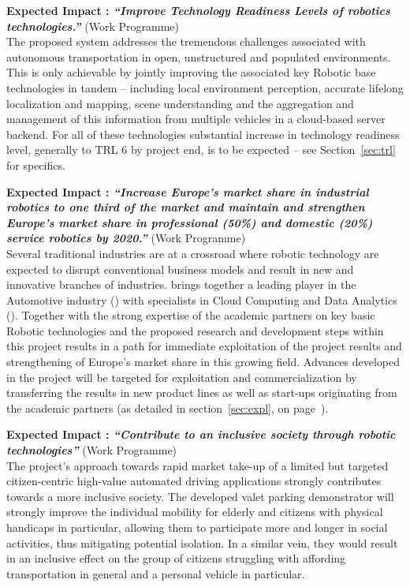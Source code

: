 \textbf{Expected Impact  : \textit{``Improve Technology Readiness Levels of robotics technologies.''}} (Work Programme) \\
The proposed system addresses the tremendous challenges associated with autonomous transportation in open, unstructured and populated environments. This is only achievable by jointly improving the associated key Robotic base technologies in tandem -- including local environment perception, accurate lifelong localization and mapping, scene understanding and the aggregation and management of this information from multiple vehicles in a cloud-based server backend. 
For all of these technologies substantial increase in technology readiness level, generally to TRL 6 by project end, is to be expected -- see Section~\ref{sec:trl} for specifics. 


\textbf{Expected Impact  : \textit{``Increase Europe's market share in industrial robotics to one third of the market and maintain and strengthen Europe's market share in professional (50\%) and domestic (20\%) service robotics by 2020.''}} (Work Programme) \\
Several traditional industries are at a crossroad where robotic technology are expected to disrupt conventional business models and result in new and innovative branches of industries. \Project{} brings together a leading player in the Automotive industry (\VW) with specialists in Cloud Computing and Data Analytics (\IBM). Together with the strong expertise of the academic partners on key basic Robotic technologies and the proposed research and development steps within this project results in a path for immediate exploitation of the project results and strengthening of Europe's market share in this growing field.
Advances developed in the project will be targeted for exploitation and commercialization by transferring the results in new product lines as well as start-ups originating from the academic partners (as detailed in section~\ref{sec:expl}, on page~\pageref{sec:expl}).


\textbf{Expected Impact  : \textit{``Contribute to an inclusive society through robotic technologies''}} (Work Programme) \\
The project's approach towards rapid market take-up of a limited but targeted citizen-centric high-value automated driving applications strongly contributes towards a more inclusive society. The developed valet parking demonstrator will strongly improve the individual mobility for elderly and citizens with physical handicaps in particular, allowing them to participate more and longer in social activities, thus mitigating potential isolation. In a similar vein, they would result in an inclusive effect on the group of citizens struggling with affording transportation in general and a personal vehicle in particular.


